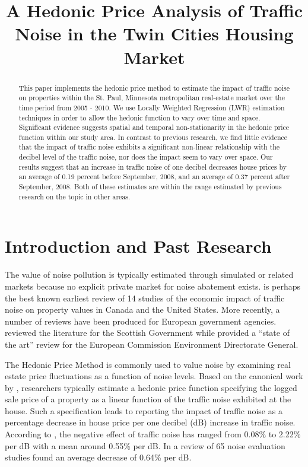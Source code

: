 \documentclass{article}\usepackage{graphicx, color}
\title{A Hedonic Price Analysis of Traffic Noise in the Twin Cities Housing Market}
\date{}
\begin{document}
\maketitle

\begin{abstract}
This paper implements the hedonic price method to estimate the impact of traffic noise on properties within the St. Paul, Minnesota metropolitan real-estate market over the time period from 2005 - 2010. We use Locally Weighted Regression (LWR) estimation techniques in order to allow the hedonic function to vary over time and space. Significant evidence suggests spatial and temporal non-stationarity in the hedonic price function within our study area. In contrast to previous research, we find little evidence that the impact of traffic noise exhibits a significant non-linear relationship with the decibel level of the traffic noise, nor does the impact seem to vary over space. Our results suggest that an increase in traffic noise of one decibel decreases house prices by an average of 0.19 percent before September, 2008, and an average of 0.37 percent after September, 2008. Both of these estimates are within the range estimated by previous research on the topic in other areas.
\end{abstract}

\section{Introduction and Past Research}\label{sec:lit}
The value of noise pollution is typically estimated through simulated or related markets because no explicit private market for noise abatement exists. \citet{Nelson1982} is perhaps the best known earliest review of 14 studies of the economic impact of traffic noise on property values in Canada and the United States. More recently, a number of reviews have been produced for European government agencies. \citet{Bateman2001} reviewed the literature for the Scottish Government while \citet{Navrud2002} provided a ``state of the art'' review for the European Commission Environment Directorate General.

The Hedonic Price Method is commonly used to value noise by examining real estate price fluctuations as a function of noise levels. Based on the canonical work by \citet{Rosen1974}, researchers typically estimate a hedonic price function specifying the logged sale price of a property as a linear function of the traffic noise exhibited at the house. Such a specification leads to reporting the impact of traffic noise as a percentage decrease in house price per one decibel (dB) increase in traffic noise. According to \citet{Bateman2001}, the negative effect of traffic noise has ranged from 0.08\% to 2.22\% per dB with a mean around 0.55\% per dB. In a review of 65 noise evaluation studies \citet{Navrud2002} found an average decrease of 0.64\% per dB. 
\end{document}
